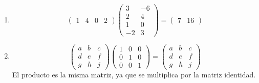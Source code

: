 \documentclass[12pt,letterpaper]{article}
\begin{document}
\begin{enumerate}
\begin{enumerate}
    \item 
    \[
    \begin{pmatrix}
    1 & 4 & 0 & 2
    \end{pmatrix}
    \begin{pmatrix}
    3 & -6\\
    2 & 4\\
    1 & 0\\
    -2 & 3
    \end{pmatrix}
    =
    \begin{pmatrix}
    7 & 16
    \end{pmatrix}
    \]

    \item 
    \[
    \begin{pmatrix}
    a & b & c\\
    d & e & f\\
    g & h & j
    \end{pmatrix}
    \begin{pmatrix}
    1 & 0 & 0\\
    0 & 1 & 0\\
    0 & 0 & 1
    \end{pmatrix}
    =
    \begin{pmatrix}
    a & b & c\\
    d & e & f\\
    g & h & j
    \end{pmatrix}
    \]
    El producto es la misma matriz, ya que se multiplica por la matriz identidad.
\end{enumerate}

\end{enumerate}
\end{document}
